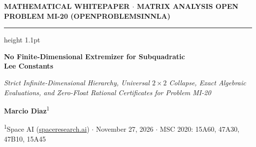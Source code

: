 \documentclass[10pt,letterpaper]{article}
\begin{document}
\thispagestyle{firstpage}

{\sffamily\footnotesize\bfseries\color{accentblue}MATHEMATICAL WHITEPAPER $\cdot$ MATRIX ANALYSIS \hfill OPEN PROBLEM MI-20 (OPENPROBLEMSINNLA)}\par
\vspace{2pt}
{\color{ink}\hrule height 1.1pt}
\vspace{12pt}

\begin{center}
  {\LARGE\bfseries\color{ink} No Finite-Dimensional Extremizer for Subquadratic\\[3pt] Lee Constants}\par
  \vspace{7pt}
  {\large\itshape\color{muted} Strict Infinite-Dimensional Hierarchy, Universal $2\times 2$ Collapse, Exact Algebraic\\[1pt] Evaluations, and Zero-Float Rational Certificates for Problem MI-20}\par
  \vspace{9pt}
  {\normalsize\bfseries Marcio Diaz}\textsuperscript{1}\par
  {\small\color{muted}\textsuperscript{1}Space AI (\href{https://spaceresearch.ai}{spaceresearch.ai}) \quad $\cdot$ \quad November 27, 2026 \quad $\cdot$ \quad MSC 2020: 15A60, 47A30, 47B10, 15A45}
\end{center}
\vspace{4pt}
\end{document}
